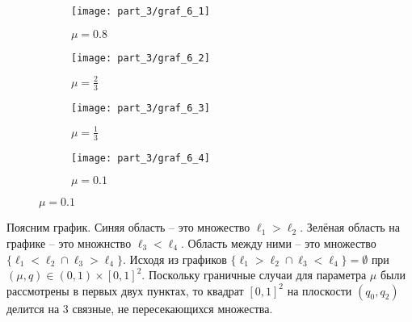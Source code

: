 \begin{figure}[H]
   	\centering
    \begin{subfigure}[b]{0.22 \textwidth}
    	\centering
    	\texttt{[image: part\_3/graf\_6\_1]}
		\caption{$\mu=0.8$}
        \label{fig:y equals x}
    \end{subfigure}
    \hfill
    \begin{subfigure}[b]{0.22 \textwidth}
       	\centering
       	\texttt{[image: part\_3/graf\_6\_2]}
       	\caption{$\mu=\frac{2}{3}$}
       	\label{fig:three sin x}
     \end{subfigure}
     \hfill
     \begin{subfigure}[b]{0.22 \textwidth}
       	\centering
       	\texttt{[image: part\_3/graf\_6\_3]}
       	\caption{$\mu=\frac{1}{3}$}
       	\label{fig:five over x}
     \end{subfigure}
     \hfill
     \begin{subfigure}[b]{0.22 \textwidth}
       	\centering
       	\texttt{[image: part\_3/graf\_6\_4]}
		\caption{$\mu=0.1$}
        \label{fig:five over x}
     \end{subfigure}
\end{figure}
Поясним график. Синяя область -- это множество $\ell_1 > \ell_2$.
Зелёная область на графике -- это множнство $\ell_3 < \ell_4$.
Область между ними -- это множество $\{\ell_1<\ell_2 \cap \ell_3 > \ell_4\}$.
Исходя из графиков $\{\ell_1>\ell_2 \cap \ell_3 < \ell_4\} = \emptyset$ 
при $(\mu, q) \in (0, 1) \times [0, 1]^2$.
Поскольку граничные случаи для параметра $\mu$ были рассмотрены в первых
двух пунктах, то квадрат $[0,1]^2$ на плоскости $(q_0,q_2)$ делится на 3
связные, не пересекающихся множества.
	

